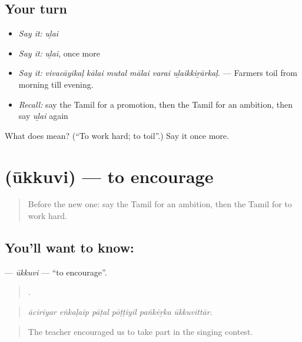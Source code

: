 \subsection*{Your turn}
\begin{itemize}
\raggedright
  \item \emph{Say it:} \emph{uḻai}
  \item \emph{Say it:} \emph{uḻai}, once more
  \item \emph{Say it:} \emph{vivacāyikaḷ kālai mutal mālai varai uḻaikkiṟārkaḷ.} — Farmers toil from morning till evening.
  \item \emph{Recall:} say the Tamil for a promotion, then the Tamil for an ambition, then say \emph{uḻai} again
\end{itemize}

\begin{tcolorbox}[breakable,colback=teal!4,colframe=teal!35!black,title={Before you move on}]
What does  mean? (\textquotedblleft{}To work hard; to toil\textquotedblright{}.) Say it once more.
\end{tcolorbox}
\section[\texorpdfstring{\ta{ஊக்குவி} (ūkkuvi)}{ஊக்குவி (ūkkuvi)}]{ (ūkkuvi) — to encourage}

\label{lesson:TA-C509-ukkuvi}



\begin{quote}
Before the new one: say the Tamil for an ambition, then the Tamil for to work hard.
\end{quote}

\subsection*{You'll want to know: }
\textbf{} — \emph{ūkkuvi} — \textquotedblleft{}to encourage\textquotedblright{}.

\begin{quote}
     .
\end{quote}

\begin{quote}
\emph{āciriyar eṅkaḷaip pāṭal pōṭṭiyil paṅkēṟka ūkkuvittār.}
\end{quote}

\begin{quote}
The teacher encouraged us to take part in the singing contest.
\end{quote}

